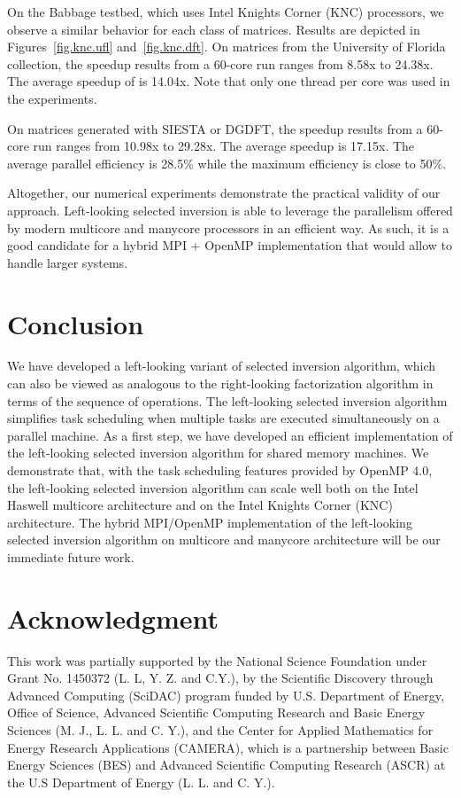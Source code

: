 \documentclass[10pt, conference, compsocconf,letterpaper,twocolumn]{IEEEtran}
\newcommand{\dgdft}{\textsf{DGDFT}\xspace}
\newcommand{\siesta}{\textsf{SIESTA}\xspace}
\begin{document}
On the Babbage testbed, which uses Intel Knights Corner (KNC) processors, we observe a similar behavior for each
class of matrices. Results are depicted in Figures~\ref{fig.knc.ufl} and~\ref{fig.knc.dft}.
On matrices from the University of Florida collection, 
the speedup results from a 60-core run ranges from 8.58x to 24.38x.
The average speedup of is 14.04x. 
Note that only one thread per core was used in the
experiments.

On matrices generated with \siesta or \dgdft, the speedup results 
from a 60-core run ranges from 10.98x to 29.28x. The average 
speedup is 17.15x. The average parallel efficiency is 28.5\% while 
the maximum efficiency is close to 50\%. 

Altogether, our numerical experiments demonstrate the
practical validity of our approach. Left-looking selected
inversion is able to leverage the parallelism offered
by modern multicore and manycore processors in an efficient 
way. As such, it is a good candidate for a hybrid
MPI + OpenMP implementation that would allow to handle
larger systems.


\section{Conclusion}
We have developed a left-looking variant of selected inversion algorithm,
which can also be viewed as analogous to the right-looking 
factorization algorithm in terms of the  sequence 
of operations. The left-looking selected inversion algorithm 
simplifies task scheduling when multiple tasks are executed simultaneously 
on a parallel machine.  As a first step, we have developed an 
efficient implementation of the left-looking selected inversion algorithm 
for shared memory machines. We demonstrate that, with the task scheduling features provided by OpenMP 4.0, the left-looking selected inversion algorithm can scale well both on the  Intel Haswell multicore architecture and on the Intel Knights Corner (KNC) architecture. The hybrid MPI/OpenMP implementation of the left-looking selected inversion algorithm on multicore and manycore architecture will be our immediate future work.

\section*{Acknowledgment}
This work was partially supported by the National Science Foundation
under Grant No. 1450372 (L. L, Y. Z. and C.Y.), by the 
Scientific Discovery through Advanced Computing (SciDAC)
program funded by U.S. Department of Energy, Office of Science, Advanced
Scientific Computing Research and Basic Energy Sciences (M. J., L. L.
and C. Y.), and the Center for Applied Mathematics for Energy Research
Applications (CAMERA), which is a partnership between Basic Energy
Sciences (BES) and Advanced Scientific Computing Research (ASCR) at the
U.S Department of Energy (L. L. and C. Y.).   




\end{document}
